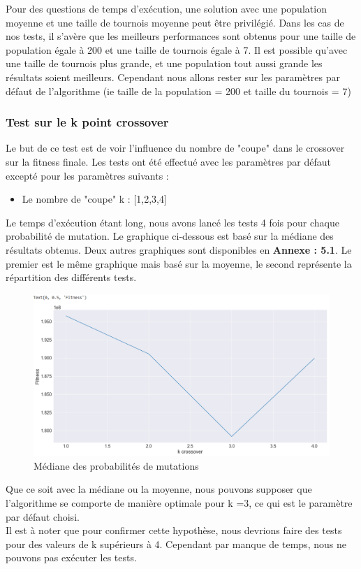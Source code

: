 \documentclass{article} %
\begin{document}
Pour des questions de temps d'exécution, une solution avec une population moyenne et une taille de tournois moyenne peut être privilégié. Dans les cas de nos tests, il s'avère que les meilleurs performances sont obtenus pour une taille de population égale à 200 et une taille de tournois égale à 7. Il est possible qu'avec une taille de tournois plus grande, et une population tout aussi grande les résultats soient meilleurs. Cependant nous allons rester sur les paramètres par défaut de l'algorithme (ie taille de la population = 200 et taille du tournois = 7)

\subsubsection{Test sur le k point crossover}
Le but de ce test est de voir l'influence du nombre de "coupe" dans le crossover sur la fitness finale. Les tests ont été effectué avec les paramètres par défaut excepté pour les paramètres suivants :
\begin{itemize}
	\item Le nombre de "coupe" k : [1,2,3,4]
\end{itemize}
Le temps d'exécution étant long, nous avons lancé les tests 4 fois pour chaque probabilité de mutation. Le graphique ci-dessous est basé sur la médiane des résultats obtenus. Deux autres graphiques sont disponibles en \textbf{Annexe : 5.1}. Le premier est le même graphique mais basé sur la moyenne, le second représente la répartition des différents tests.
\begin{figure}[!h]
	\centering
	\includegraphics[keepaspectratio = true,scale=0.65]{kcross_median.png}
	\caption{Médiane des probabilités de mutations}
\end{figure}
Que ce soit avec la médiane ou la moyenne, nous pouvons supposer que l'algorithme se comporte de manière optimale pour k =3, ce qui est le paramètre par défaut choisi.\\
Il est à noter que pour confirmer cette hypothèse, nous devrions faire des tests pour des valeurs de k supérieurs à 4. Cependant par manque de temps, nous ne pouvons pas exécuter les tests.
\end{document}
